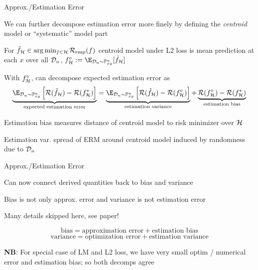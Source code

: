 \documentclass[11pt,compress,t,notes=noshow, xcolor=table]{beamer}
\begin{document}
\begin{framei}[sep=M]{Approx./Estimation Error }

\item We can further decompose estimation error more finely by defining the \textit{centroid} model or ``systematic'' model part

\item For $\hat{f}_{\mathcal{H}} \in  \arg\min_{f \in \mathcal{H}} \mathcal{R}_{\text{emp}}(f)$ centroid model under L2 loss is mean prediction at each $x$ over all $\mathcal{D}_n$, $f^{\circ}_{\Hspace} := \E_{\D_n \sim \Pxy^n}[\fh_{\Hspace}] $

\item With $f^{\circ}_{\mathcal{H}}$, can decompose expected estimation error as
$$
\underbrace{\E_{\D_n \sim \Pxy^n}\left[\risk(\hat{f}_{\Hspace}) - \risk(f ^{\ast}_{\Hspace})\right]}_{\text{expected estimation error}} = \underbrace{\E_{\D_n \sim \Pxy^n}\left[\risk(\hat{f}_{\Hspace}) - \risk(f^{\circ}_{\Hspace}) \right]}_{\text{estimation variance}} + \underbrace{\risk(f^{\circ}_{\Hspace})-\risk(f^{\ast}_{\Hspace})}_{\text{estimation bias}}   
$$

\item Estimation bias measures distance of centroid model to risk minimizer over $\mathcal{H}$
\item Estimation var. spread of ERM around centroid model induced by randomness due to $\mathcal{D}_n$

\end{framei}


\begin{framei}[sep=M]{Approx./Estimation Error }

\item Can now connect derived quantities back to bias and variance 
\item Bias is not only approx. error and variance is not estimation error
\item Many details skipped here, see paper!

$$ \text{bias} = \text{approximation error} + \text{estimation bias} $$
$$\text{variance} = \text{optimization error} + \text{estimation variance}$$


\item \textbf{NB}: For special case of LM and L2 loss, we have very small optim / numerical error and estimation bias; so both decomps agree

\end{framei}

\endlecture
\end{document}
